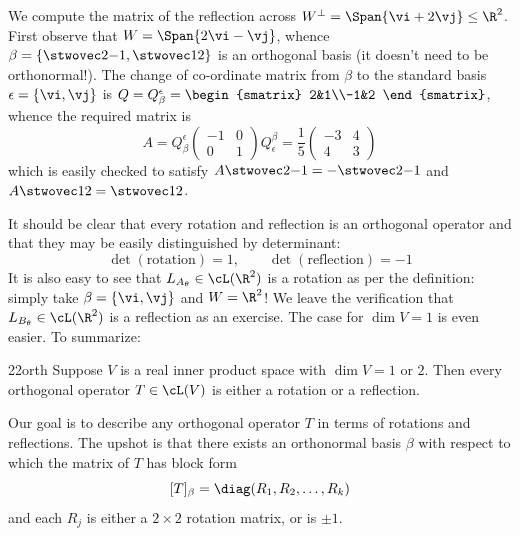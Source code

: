 \begin{example}{}{}
We compute the matrix of the reflection across $W^\perp=\Span\{\vi+2\vj\}\le\R^2$.\\[5pt]
First observe that $W=\Span\{2\vi-\vj\}$, whence $\beta=\{\stwovec 2{-1},\stwovec 12\}$ is an orthogonal basis (it doesn't need to be orthonormal!). The change of co-ordinate matrix from $\beta$ to the standard basis $\epsilon=\{\vi,\vj\}$ is $Q=Q_\beta^\epsilon=\begin{smatrix}
2&1\\-1&2
\end{smatrix}$, whence the required matrix is
\[A=Q_\beta^\epsilon\begin{pmatrix}
-1&0\\0&1
\end{pmatrix}Q_\epsilon^\beta =\frac 15\begin{pmatrix}
-3&4\\4&3
\end{pmatrix}\]
which is easily checked to satisfy $A\stwovec 2{-1}=-\stwovec 2{-1}$ and $A\stwovec 12=\stwovec 12$.
\end{example}

It should be clear that every rotation and reflection is an orthogonal operator and that they may be easily distinguished by determinant:
\[\det(\text{rotation})=1,\qquad \det(\text{reflection})=-1\]
It is also easy to see that $L_{A_\theta}\in\cL(\R^2)$ is a rotation as per the definition: simply take $\beta=\{\vi,\vj\}$ and $W=\R^2$! We leave the verification that $L_{B_\theta}\in\cL(\R^2)$ is a reflection as an exercise. The case for $\dim V=1$ is even easier. To summarize:

\begin{lemm}{}{22orth}
Suppose $V$ is a real inner product space with $\dim V=1$ or $2$. Then every orthogonal operator $T\in\cL(V)$ is either a rotation or a reflection.
\end{lemm}


Our goal is to describe any orthogonal operator $T$ in terms of rotations and reflections. The upshot is that there exists an orthonormal basis $\beta$ with respect to which the matrix of $T$ has block form
\[[T]_\beta=\diag(R_1,R_2,\ldots,R_k)\]
and each $R_j$ is either a $2\times 2$ rotation matrix, or is $\pm 1$.

